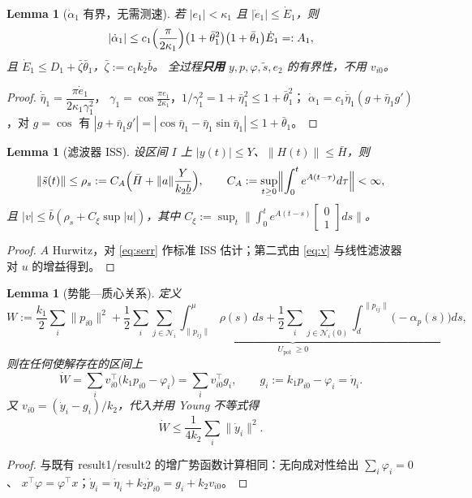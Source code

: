 \documentclass[11pt,a4paper]{article}
\newcommand{\ub}{\underline{b}}
\theoremstyle{plain}
\newtheorem{lemma}[theorem]{Lemma}
\theoremstyle{definition}
\theoremstyle{remark}
\begin{document}
\begin{lemma}[$\dot\alpha_1$ 有界，无需测速]\label{lem:alphadot}
若 $|e_1|<\kappa_1$ 且 $|\dot e_1|\le\dot E_1$，则
\begin{equation*}
|\dot\alpha_1|\le
c_1\Bigl(\frac{\pi}{2\kappa_1}\Bigr)\bigl(1+\bar\theta_1^2\bigr)\bigl(1+\bar\theta_1\bigr)\dot E_1
=:A_1,
\end{equation*}
且 $\dot E_1\le D_1+\bar\zeta\bar\theta_1$，$\bar\zeta:=c_1k_2\bar b$。
全过程\textbf{只用} $y,p,\varphi,\tilde s,e_2$ 的有界性，不用 $v_{i0}$。
\end{lemma}
\begin{proof}
$\dot{\bar\eta}_1=\dfrac{\pi\dot e_1}{2\kappa_1\gamma_1^2}$，
$\gamma_1=\cos\frac{\pi e_1}{2\kappa_1}$，$1/\gamma_1^2=1+\bar\eta_1^2\le1+\bar\theta_1^2$；
$\dot\alpha_1=c_1\dot{\bar\eta}_1(g+\bar\eta_1g')$，对 $g=\cos$ 有
$|g+\bar\eta_1g'|=|\cos\bar\eta_1-\bar\eta_1\sin\bar\eta_1|\le1+\bar\theta_1$。
\end{proof}

\begin{lemma}[滤波器 ISS]\label{lem:iss}
设区间 $I$ 上 $|y(t)|\le Y$、$\|H(t)\|\le\bar H$，则
\begin{equation*}
\|\tilde s(t)\|\le\rho_s:=C_A\Bigl(\bar H+\|a\|\frac{Y}{k_2\ub}\Bigr),
\qquad
C_A:=\sup_{t\ge0}\Bigl\|\int_0^te^{A(t-\tau)}d\tau\Bigr\|<\infty,
\end{equation*}
且 $|v|\le\bar b(\rho_s+C_\xi\sup|u|)$，其中
$C_\xi:=\sup_t\bigl\|\int_0^te^{A(t-s)}\begin{bmatrix}0\\1\end{bmatrix}ds\bigr\|$。
\end{lemma}
\begin{proof}
$A$ Hurwitz，对 \eqref{eq:serr} 作标准 ISS 估计；第二式由 \eqref{eq:v} 与线性滤波器
对 $u$ 的增益得到。
\end{proof}

\begin{lemma}[势能—质心关系]\label{lem:W}
定义
\begin{equation*}
W:=\frac{k_1}{2}\sum_i\|p_{i0}\|^2
+\underbrace{\frac12\sum_i\sum_{j\in\mathcal N_i}\int_{\|p_{ij}\|}^{\mu}\rho(s)\,ds
+\frac12\sum_i\sum_{j\in\mathcal N_i(0)}\int_{d}^{\|p_{ij}\|}\bigl(-\alpha_p(s)\bigr)ds}_{\displaystyle U_{\mathrm{pot}}\ \ge0},
\end{equation*}
则在任何使解存在的区间上
\begin{equation}
\dot W=\sum_i v_{i0}^{\top}\bigl(k_1p_{i0}-\varphi_i\bigr)
=\sum_i v_{i0}^{\top}g_i,\qquad g_i:=k_1p_{i0}-\varphi_i=\dot\eta_i .
\label{eq:Wdot}\tag{4.7}
\end{equation}
又 $v_{i0}=(\dot y_i-g_i)/k_2$，代入并用 Young 不等式得
\begin{equation}
\dot W\le\frac{1}{4k_2}\sum_i\|\dot y_i\|^2 .
\label{eq:Wdot2}\tag{4.8}
\end{equation}
\end{lemma}
\begin{proof}
与既有 result1/result2 的增广势函数计算相同：无向成对性给出 $\sum_i\varphi_i=0$、
$x^\top\varphi=\varphi^\top x$；$\dot y_i=\dot\eta_i+k_2\dot p_{i0}=g_i+k_2v_{i0}$。
\end{proof}
\end{document}
